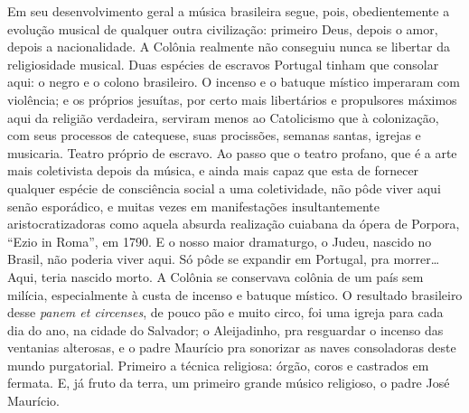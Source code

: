 Em seu desenvolvimento geral a música brasileira segue, pois,
obedientemente a evolução musical de qualquer outra civilização:
primeiro Deus, depois o amor, depois a nacionalidade. A Colônia
realmente não conseguiu nunca se libertar da religiosidade musical. Duas
espécies de escravos Portugal tinham que consolar aqui: o negro e o
colono brasileiro. O incenso e o batuque místico imperaram com
violência; e os próprios jesuítas, por certo mais libertários e
propulsores máximos aqui da religião verdadeira, serviram menos ao
Catolicismo que à colonização, com seus processos de catequese, suas
procissões, semanas santas, igrejas e musicaria. Teatro próprio de
escravo. Ao passo que o teatro profano, que é a arte mais coletivista
depois da música, e ainda mais capaz que esta de fornecer qualquer
espécie de consciência social a uma coletividade, não pôde viver aqui
senão esporádico, e muitas vezes em manifestações insultantemente
aristocratizadoras como aquela absurda realização cuiabana da ópera de
Porpora, ``Ezio in Roma'', em 1790. E o nosso maior dramaturgo, o Judeu,
nascido no Brasil, não poderia viver aqui. Só pôde se expandir em
Portugal, pra morrer\ldots{} Aqui, teria nascido morto. A Colônia se
conservava colônia de um país sem milícia, especialmente à custa de
incenso e batuque místico. O resultado brasileiro desse \textit{panem et
circenses}, de pouco pão e muito circo, foi uma igreja para cada dia do
ano, na cidade do Salvador; o Aleijadinho, pra resguardar o incenso das
ventanias alterosas, e o padre Maurício pra sonorizar as naves
consoladoras deste mundo purgatorial. Primeiro a técnica religiosa:
órgão, coros e castrados em fermata. E, já fruto da terra, um primeiro
grande músico religioso, o padre José Maurício.

